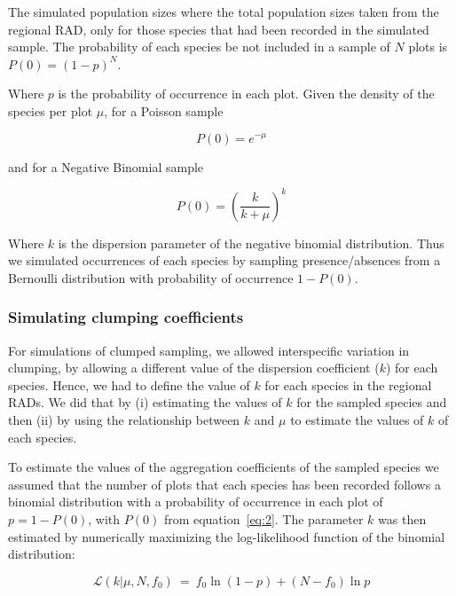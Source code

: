 \documentclass[12pt, A4]{article}\usepackage[]{graphicx}\usepackage[]{color}
\begin{document}
The simulated population sizes where the total population sizes taken from
the regional RAD, only for those species that had been recorded 
in the simulated sample. 
The probability of each species be not included in a sample of $N$ plots is  $P(0)=(1-p)^N$.

Where $p$ is the probability of occurrence in each plot. 
Given the density of the species per plot $\mu$, 
for a Poisson sample 

\begin{equation}
  \label{eq:3}
  P(0) = e^{-\mu} 
\end{equation} 

and for a Negative Binomial sample

\begin{equation}
  \label{eq:2}
  P(0) = \left( \frac{k}{k+\mu} \right)^k 
\end{equation}

Where $k$ is the dispersion parameter of the negative binomial distribution.
Thus we simulated occurrences of each species by sampling presence/absences
from a Bernoulli distribution with probability of occurrence $1-P(0)$.

\subsubsection*{Simulating clumping coefficients}

For simulations of clumped sampling, 
we allowed interspecific variation in clumping, 
by allowing a different value of the dispersion coefficient ($k$) for each species.
Hence, we had to define the value of $k$ for each species in the regional
RADs. We did that by (i) estimating the values of $k$ for the sampled species and
then (ii) by using the relationship between $k$ and $\mu$ to estimate the values of $k$
of each species.

To estimate the values of the aggregation coefficients
of the sampled species
we assumed that the number of plots that each species has been recorded follows
a binomial distribution with a probability of occurrence in each plot of $p=1-P(0)$,
with $P(0)$ from equation~\ref{eq:2}.
The parameter $k$ was then estimated by numerically maximizing the
log-likelihood function of the binomial distribution:

\begin{equation}
  \mathcal{L}(k | \mu, N, f_0) \ =  \ f_0 \ln (1-p) + (N - f_0) \ln p
\end{equation}
\end{document}
